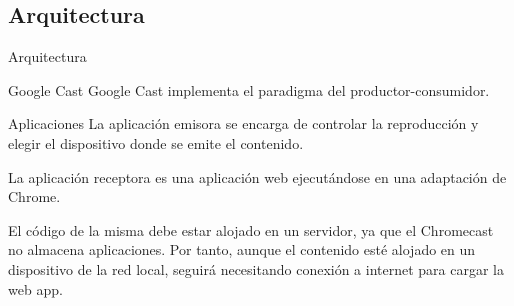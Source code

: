 \subsection{Arquitectura}
\begin{frame}{Arquitectura}
	\begin{block}{Google Cast}
		Google Cast implementa el paradigma del productor-consumidor.
	\end{block}
	
	\begin{block}{Aplicaciones}
		La aplicación emisora se encarga de controlar la reproducción y elegir el dispositivo donde se emite el contenido. 
		
		La aplicación receptora es una aplicación web ejecutándose en una adaptación de Chrome.
		
		El código de la misma debe estar alojado en un servidor, ya que el Chromecast no almacena aplicaciones. Por tanto, aunque el contenido esté alojado en un dispositivo de la red local, seguirá necesitando conexión a internet para cargar la web app. 
	\end{block}
\end{frame}

